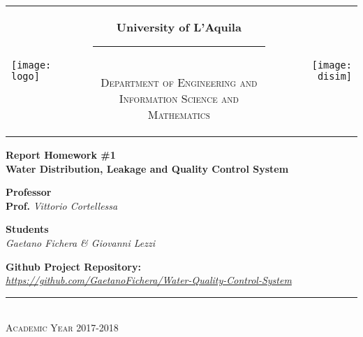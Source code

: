 \begin{titlepage}
\begin{center}
\normalsize

\begin{center}

\begin{tabular}[t]{@{} l @{} c @{} r @{}}
\parbox[c]{0.15\textwidth}{\raggedright \texttt{[image: logo]}}
&
\parbox[c]{0.7\textwidth}
{
\centering \bfseries
University of L'Aquila \\[-5pt]
\rule{0.6\textwidth}{1pt} \\
{\centering \scshape \small Department of Engineering and \\Information Science and Mathematics} \\}
&
\parbox[c]{0.15\textwidth}{\raggedleft \texttt{[image: disim]}}
\end{tabular}
\end{center}

\bigskip \bigskip



\bigskip
\bigskip

\vfil

{\bfseries \Large
Report Homework \#1 \\}
\bigskip
{\bfseries \Large
Water Distribution, Leakage and Quality Control System
}

{\large
\bigskip
\bigskip
\bigskip
\bigskip
{\bfseries \large Professor \\ }
\bigskip
\textbf{Prof.} \textit{Vittorio Cortellessa} \\
}

{\large
\bigskip
\bigskip
\bigskip
\bigskip
{\bfseries \large Students \\ }
\bigskip
\textit{Gaetano Fichera \& Giovanni Lezzi} \\
}

\vfil
\vfil

\vspace{2\baselineskip}

{\large
\bigskip
\bigskip
\bigskip
\bigskip
{\bfseries \large Github Project Repository: \\ }
\bigskip
\textit{\href{https://github.com/GaetanoFichera/Water-Quality-Control-System}{https://github.com/GaetanoFichera/Water-Quality-Control-System}} \\
}

\vfil \vfil \vfil

\rule{\textwidth}{1pt}\\
{\scshape Academic Year 2017-2018}

\end{center}
\end{titlepage}